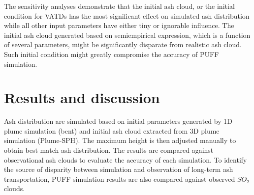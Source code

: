 The sensitivity analyses demonstrate that the initial ash cloud, or the initial condition for VATDs has the most significant effect on simulated ash distribution while all other input parameters have either tiny or ignorable influence. The initial ash cloud generated based on semiempirical expression, which is a function of several parameters, might be significantly disparate from realistic ash cloud. Such initial condition might greatly compromise the accuracy of PUFF simulation.

\section{Results and discussion}

Ash distribution are simulated based on initial parameters generated by 1D plume simulation (bent) and initial ash cloud extracted from 3D plume simulation (Plume-SPH). The maximum height is then adjusted manually to obtain best match ash distribution. The results are compared against observational ash clouds to evaluate the accuracy of each simulation. To identify the source of disparity between simulation and observation of long-term ash transportation, PUFF simulation results are also compared against observed $SO_2$ clouds.

